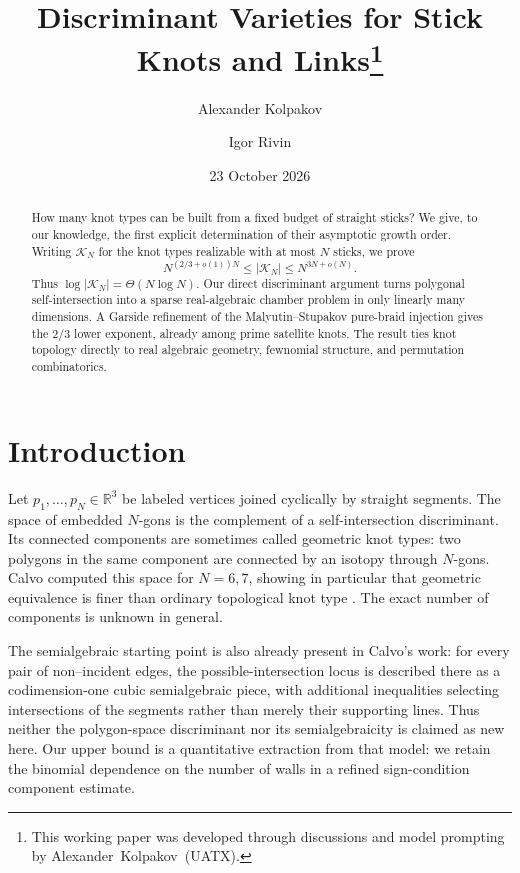 \documentclass[11pt]{article}
\title{Discriminant Varieties for Stick Knots and Links\thanks{This working paper was developed through discussions and model prompting by \mbox{Alexander Kolpakov (UATX)}.}}
\author{Alexander Kolpakov \and Igor Rivin}
\date{23 October 2026}
\theoremstyle{remark}
\theoremstyle{plain}
\newcommand{\R}{\mathbb{R}}
\newcommand{\Kcal}{\mathcal{K}}
\begin{document}
\maketitle

\begin{abstract}
How many knot types can be built from a fixed budget of straight sticks?  We
give, to our knowledge, the first explicit determination of their asymptotic
growth order.  Writing \(\Kcal_N\) for the knot types realizable with at most
\(N\) sticks, we prove
\[
 N^{(2/3+o(1))N}\le |\Kcal_N|\le N^{3N+o(N)}.
\]
Thus \(\log|\Kcal_N|=\Theta(N\log N)\).  Our direct discriminant
argument turns polygonal
self-intersection into a sparse real-algebraic chamber problem in only
linearly many dimensions.  A Garside refinement of the Malyutin--Stupakov
pure-braid injection gives the \(2/3\) lower exponent, already among prime
satellite knots.  The result
ties knot topology directly to real algebraic geometry, fewnomial structure,
and permutation combinatorics.
\end{abstract}

\section{Introduction}

Let \(p_1,\ldots,p_N\in\R^3\) be labeled vertices joined cyclically by straight
segments.  The space of embedded \(N\)-gons is the complement of a
self-intersection discriminant.  Its connected components are sometimes called
geometric knot types: two polygons in the same component are connected by an
isotopy through \(N\)-gons.  Calvo computed this space for \(N=6,7\), showing in
particular that geometric equivalence is finer than ordinary topological knot
type \cite{Calvo}.  The exact number of components is unknown in general.

The semialgebraic starting point is also already present in Calvo's work:
for every pair of non--incident edges, the possible-intersection locus is
described there as a codimension-one cubic semialgebraic piece, with additional
inequalities selecting intersections of the segments rather than merely their
supporting lines.  Thus neither the polygon-space discriminant nor its
semialgebraicity is claimed as new here.  Our upper bound is a quantitative
extraction from that model: we retain the binomial dependence on the number of
walls in a refined sign-condition component estimate.
\end{document}
